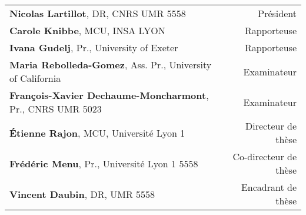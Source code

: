 \begin{titlepage}
\begin{center}
\begin{tabular}{lr}
\vspace{-0.2cm}
	\small \textbf{Nicolas Lartillot}, DR, CNRS UMR 5558 & Président \\
	\vspace{-0.2cm}
	\small \textbf{Carole Knibbe}, MCU, INSA LYON & Rapporteuse \\%
    \vspace{-0.2cm}
	\small \textbf{Ivana Gudelj}, Pr., University of Exeter & Rapporteuse \\
    \vspace{-0.2cm}
	\small \textbf{Maria Rebolleda-Gomez}, Ass. Pr., University of California & Examinateur \\
	\vspace{-0.2cm}
	\small \textbf{François-Xavier Dechaume-Moncharmont}, Pr., CNRS UMR 5023 & Examinateur \\
    \vspace{-0.2cm}
	\small \textbf{Étienne Rajon}, MCU, Université Lyon 1 & Directeur de thèse \\
    \vspace{-0.2cm}
    \small \textbf{Frédéric Menu}, Pr., Université Lyon 1 5558 & Co-directeur de thèse \\
    \vspace{-0.2cm}
    \small \textbf{Vincent Daubin}, DR, UMR 5558 & Encadrant de thèse  \\
\end{tabular}
\end{center}
\end{titlepage}
